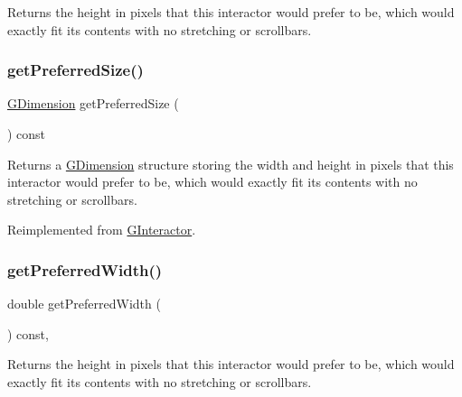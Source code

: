Returns the height in pixels that this interactor would prefer to be, which would exactly fit its contents with no stretching or scrollbars. 

\mbox{\label{classGContainer_a21904b305edacd8f871d6951cb8d3fa5}} 
\subsubsection{\texorpdfstring{get\+Preferred\+Size()}{getPreferredSize()}}
{\footnotesize\ttfamily \mbox{\hyperlink{classGDimension}{G\+Dimension}} get\+Preferred\+Size (\begin{DoxyParamCaption}{ }\end{DoxyParamCaption}) const\hspace{0.3cm}{\ttfamily [virtual]}}



Returns a \mbox{\hyperlink{classGDimension}{G\+Dimension}} structure storing the width and height in pixels that this interactor would prefer to be, which would exactly fit its contents with no stretching or scrollbars. 



Reimplemented from \mbox{\hyperlink{classGInteractor_a4aabbee761d8e9116275401131b7ccd1}{G\+Interactor}}.

\mbox{\label{classGInteractor_a82bca31d37700fb0e35d2743352efd5e}} 
\subsubsection{\texorpdfstring{get\+Preferred\+Width()}{getPreferredWidth()}}
{\footnotesize\ttfamily double get\+Preferred\+Width (\begin{DoxyParamCaption}{ }\end{DoxyParamCaption}) const\hspace{0.3cm}{\ttfamily [virtual]}, {\ttfamily [inherited]}}



Returns the height in pixels that this interactor would prefer to be, which would exactly fit its contents with no stretching or scrollbars. 


